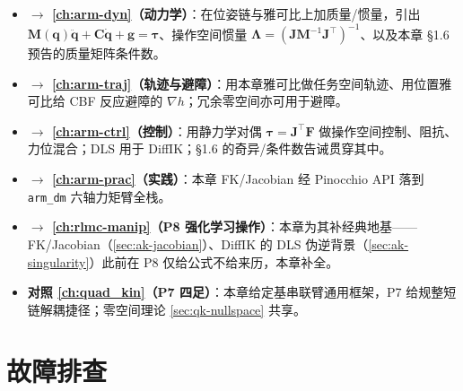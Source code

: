 \begin{itemize}
  \item \textbf{$\to$ \cref{ch:arm-dyn}（动力学）}：在位姿链与雅可比上加质量/惯量，引出 $\mathbf{M}(\mathbf{q})\ddot{\mathbf{q}}+\mathbf{C}\dot{\mathbf{q}}+\mathbf{g}=\boldsymbol{\tau}$、操作空间惯量 $\boldsymbol{\Lambda}=(\mathbf{J}\mathbf{M}^{-1}\mathbf{J}^\top)^{-1}$、以及本章 §1.6 预告的质量矩阵条件数。
  \item \textbf{$\to$ \cref{ch:arm-traj}（轨迹与避障）}：用本章雅可比做任务空间轨迹、用位置雅可比给 CBF 反应避障的 $\nabla h$；冗余零空间亦可用于避障。
  \item \textbf{$\to$ \cref{ch:arm-ctrl}（控制）}：用静力学对偶 $\boldsymbol{\tau}=\mathbf{J}^\top\mathbf{F}$ 做操作空间控制、阻抗、力位混合；DLS 用于 DiffIK；§1.6 的奇异/条件数告诫贯穿其中。
  \item \textbf{$\to$ \cref{ch:arm-prac}（实践）}：本章 FK/Jacobian 经 Pinocchio API 落到 \texttt{arm\_dm} 六轴力矩臂全栈。
  \item \textbf{$\to$ \cref{ch:rlmc-manip}（P8 强化学习操作）}：本章为其补经典地基——FK/Jacobian（\cref{sec:ak-jacobian}）、DiffIK 的 DLS 伪逆背景（\cref{sec:ak-singularity}）此前在 P8 仅给公式不给来历，本章补全。
  \item \textbf{对照 \cref{ch:quad_kin}（P7 四足）}：本章给定基串联臂通用框架，P7 给规整短链解耦捷径；零空间理论 \cref{sec:qk-nullspace} 共享。
\end{itemize}

\section*{故障排查}

